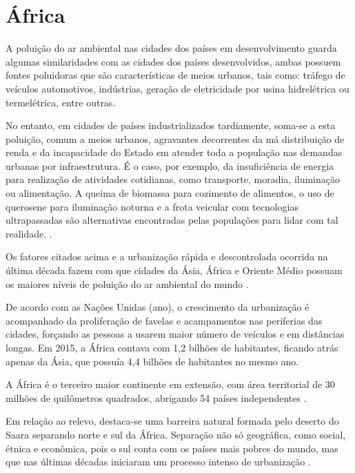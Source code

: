 \section{África}

A poluição do ar ambiental nas cidades dos países em desenvolvimento
guarda algumas similaridades com as cidades dos países desenvolvidos,
ambas possuem fontes poluidoras que são características de meios urbanos, 
tais como: tráfego de veículos automotivos, indústrias, geração de 
eletricidade por usina hidrelétrica ou termelétrica, entre outras. 

No entanto, em cidades de países industrializados tardiamente, soma-se a esta 
poluição, comum a meios urbanos, agravantes decorrentes da má distribuição de renda e 
da incapacidade do Estado em atender toda a população nas demandas urbanas 
por infraestrutura. É o caso, por exemplo, da insuficiência de energia para realização de atividades cotidianas, 
como transporte, moradia, iluminação ou alimentação. 
A queima de biomassa para cozimento de alimentos, o uso de querosene para 
iluminação noturna e a frota veicular com tecnologias ultrapassadas são alternativas
encontradas pelas populações para lidar com tal realidade.
\citep{brauer2012}.

Os fatores citados acima e a urbanização rápida e descontrolada ocorrida na
última década fazem com que cidades da Ásia, África e Oriente 
Médio possuam os maiores níveis de poluição do ar ambiental do mundo 
\citep{brauer2012}.

De acordo com as Nações Unidas (ano), o crescimento da urbanização é acompanhado 
da proliferação de favelas e acampamentos nas periferias das cidades, forçando
as pessoas a usarem maior número de veículos e em distâncias longas.  
Em 2015, a África contava com 1,2 bilhões de habitantes, ficando atrás 
apenas da Ásia, que possuía 4,4 bilhões de habitantes no mesmo ano.
 
A África é o terceiro maior continente em extensão, com área territorial 
de 30 milhões de quilômetros quadrados, abrigando 54 países independentes 
\citep{UN}.

Em relação ao relevo, destaca-se uma barreira natural formada pelo deserto do 
Saara separando norte e sul da África. Separação não só geográfica, como
social, étnica e econômica, pois o sul conta com os países mais pobres do mundo, 
mas que nas últimas décadas iniciaram um processo intenso de urbanização 
\citep{UN}.



   	
